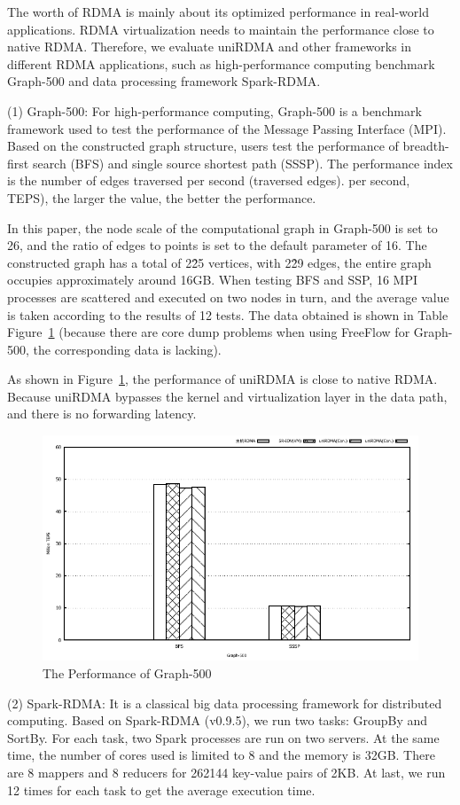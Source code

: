 The worth of RDMA is mainly about its optimized performance in real-world applications. RDMA virtualization needs to maintain the performance close to native RDMA. Therefore, we evaluate uniRDMA and other frameworks in different RDMA applications, such as high-performance computing benchmark Graph-500 and data processing framework Spark-RDMA.

(1) Graph-500: For high-performance computing, Graph-500 is a benchmark framework used to test the performance of the Message Passing Interface (MPI). Based on the constructed graph structure, users test the performance of breadth-first search (BFS) and single source shortest path (SSSP). The performance index is the number of edges traversed per second (traversed edges). per second, TEPS), the larger the value, the better the performance.

In this paper, the node scale of the computational graph in Graph-500 is set to 26, and the ratio of edges to points is set to the default parameter of 16. The constructed graph has a total of 2\^25 vertices, with 2\^29 edges, the entire graph occupies approximately around 16GB. When testing BFS and SSP, 16 MPI processes are scattered and executed on two nodes in turn, and the average value is taken according to the results of 12 tests. The data obtained is shown in Table Figure~\ref{fig:graph-500} (because there are core dump problems when using FreeFlow for Graph-500, the corresponding data is lacking).

As shown in Figure~\ref{fig:graph-500},  the performance of uniRDMA is close to native RDMA. Because uniRDMA bypasses the kernel and virtualization layer in the data path, and there is no forwarding latency.

\begin{figure}[!ht]
	\centering
	\includegraphics[width=1.0\linewidth]{images/graph-500.pdf}
	\caption{The Performance of Graph-500}
	\label{fig:graph-500}
\end{figure}

(2) Spark-RDMA: It is a classical big data processing framework for distributed computing. Based on Spark-RDMA (v0.9.5), we run two tasks: GroupBy and SortBy. For each task, two Spark processes are run on two servers. At the same time, the number of cores used is limited to 8 and the memory is 32GB. There are 8 mappers and 8 reducers for 262144 key-value pairs of 2KB. At last, we run 12 times for each task to get the average execution time.
